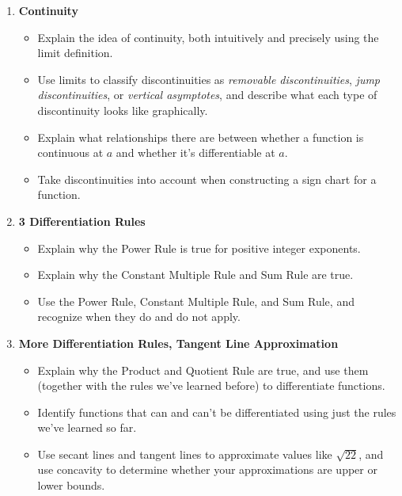 \documentclass{article}
\begin{document}
\begin{enumerate}[start=16, topsep=0pt]
\item \textbf{Continuity} %
\begin{itemize}
\item Explain the idea of continuity, both intuitively and precisely using the limit definition.

\item Use limits to classify discontinuities as \emph{removable discontinuities}, \emph{jump discontinuities}, or \emph{vertical asymptotes}, and describe what each type of discontinuity looks like graphically.

\item Explain what relationships there are between whether a function is continuous at $a$ and whether it's differentiable at $a$.

\item Take discontinuities into account when constructing a sign chart for a function. 
\end{itemize}

\item \textbf{3 Differentiation Rules} %
\begin{itemize}
\item Explain why the Power Rule is true for positive integer exponents.

\item Explain why the Constant Multiple Rule and Sum Rule are true.

\item Use the Power Rule, Constant Multiple Rule, and Sum Rule, and recognize when they do and do not apply.

\end{itemize}

\item \textbf{More Differentiation Rules, Tangent Line Approximation} %
\begin{itemize}
\item Explain why the Product and Quotient Rule are true, and use them (together with the rules we've learned before) to differentiate functions.

\item Identify functions that can and can't be differentiated using just the rules we've learned so far.

\item Use secant lines and tangent lines to approximate values like $\sqrt{22}$, and use concavity to determine whether your approximations are upper or lower bounds. 


\end{itemize}
\end{enumerate}
\end{document}
